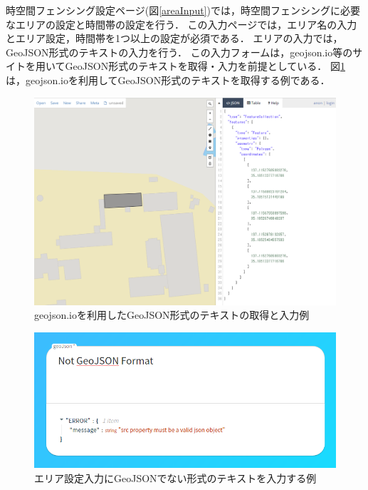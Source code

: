 時空間フェンシング設定ページ(図\ref{areaInput})では，時空間フェンシングに必要なエリアの設定と時間帯の設定を行う．
この入力ページでは，エリア名の入力とエリア設定，時間帯を1つ以上の設定が必須である．
エリアの入力では，GeoJSON形式のテキストの入力を行う．
この入力フォームは，geojson.io\cite{geojson}等のサイトを用いてGeoJSON形式のテキストを取得・入力を前提としている．
図\ref{geojsonIo}は，geojson.ioを利用してGeoJSON形式のテキストを取得する例である．
\begin{figure}[H]
  \centering
  \includegraphics[width=150mm]{geojsonIo.png}
  \caption{geojson.ioを利用したGeoJSON形式のテキストの取得と入力例}
  \label{geojsonIo}
\end{figure}

\begin{figure}[H]
  \centering
  \includegraphics[width=120mm]{notGeoJSONFormat.png}
  \caption{エリア設定入力にGeoJSONでない形式のテキストを入力する例}
  \label{fig401}
\end{figure}

